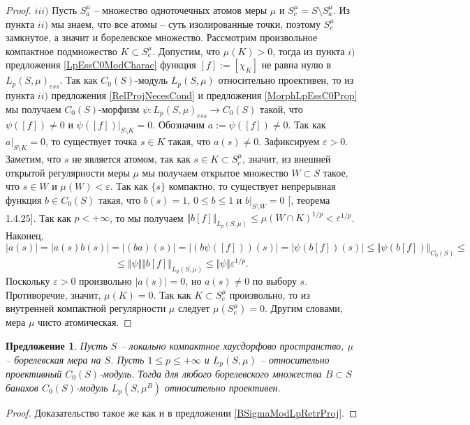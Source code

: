 \documentclass[12pt]{article}
\newtheorem{proposition}[theorem]{Предложение}
\begin{document}
\begin{proof}
    $iii)$ Пусть $S_a^\mu$ -- множество одноточечных атомов меры $\mu$ и $S_c^\mu=S\setminus S_a^\mu$. Из пункта $ii)$ мы знаем, что все атомы -- суть изолированные точки, поэтому $S_c^\mu$ замкнутое, а значит и борелевское множество. Рассмотрим произвольное компактное подмножество $K\subset S_c^\mu$. Допустим, что $\mu(K)>0$, тогда из пункта $i)$ предложения \ref{LpEssC0ModCharac} функция $[f]:=[\chi_K]$ не равна нулю в $L_p(S,\mu)_{ess}$. Так как $C_0(S)$-модуль $L_p(S, \mu)$ относительно проективен, то из пункта $ii)$ предложения \ref{RelProjNecesCond} и предложения \ref{MorphLpEssC0Prop} мы получаем $C_0(S)$-морфизм $\psi:L_p(S,\mu)_{ess}\to C_0(S)$ такой, что $\psi([f])\neq 0$ и $\psi([f])|_{S\setminus K}=0$. Обозначим $a:=\psi([f])\neq 0$. Так как $a|_{S\setminus K}=0$, то существует точка $s\in K$ такая, что $a(s)\neq 0$. Зафиксируем $\varepsilon > 0$. Заметим, что $s$ не является атомом, так как $s\in K\subset S_c^\mu$, значит, из внешней открытой регулярности меры $\mu$ мы получаем открытое множество $W\subset S$ такое, что $s\in W$ и $\mu(W)<\varepsilon$. Так как $\{s\}$ компактно, то существует непрерывная функция $b\in C_0(S)$ такая, что $b(s)=1$, $0\leq b\leq 1$ и $b|_{S\setminus W}=0$ [\cite{DalesBanSpContFunDualSp}, теорема 1.4.25]. Так как $p<+\infty$, то мы получаем $\Vert b[f]\Vert_{L_p(S,\mu)} \leq \mu(W\cap K)^{1/p}<\varepsilon^{1/p}$. Наконец,
    $$
        |a(s)|=|a(s)b(s)|=|(ba)(s)|=|(b\psi([f]))(s)|=|\psi(b[f])(s)|\leq\Vert \psi (b[f])\Vert_{C_0(S)}\leq
    $$
    $$
        \leq\Vert\psi\Vert\Vert b[f]\Vert_{L_p(S,\mu)}\leq\Vert\psi\Vert\varepsilon^{1/p}.
    $$
    Поскольку $\varepsilon>0$ произвольно $|a(s)|=0$, но $a(s)\neq 0$ по выбору $s$. Противоречие, значит, $\mu(K)=0$. Так как $K\subset S_c^\mu$ произвольно, то из внутренней компактной регулярности $\mu$ следует $\mu(S_c^\mu)=0$. Другим словами, мера $\mu$ чисто атомическая.
\end{proof}

\begin{proposition}\label{C0ModLpRetrProj} Пусть $S$ -- локально компактное хаусдорфово пространство, $\mu$ -- борелевская мера на $S$. Пусть $1\leq p\leq +\infty$ и $L_p(S,\mu)$ -- относительно проективный $C_0(S)$-модуль. Тогда для любого борелевского множества $B\subset S$ банахов $C_0(S)$-модуль $L_p(S,\mu^B)$ относительно проективен.
\end{proposition}
\begin{proof} Доказательство такое же как и в предложении \ref{BSigmaModLpRetrProj}.
\end{proof}
\end{document}
